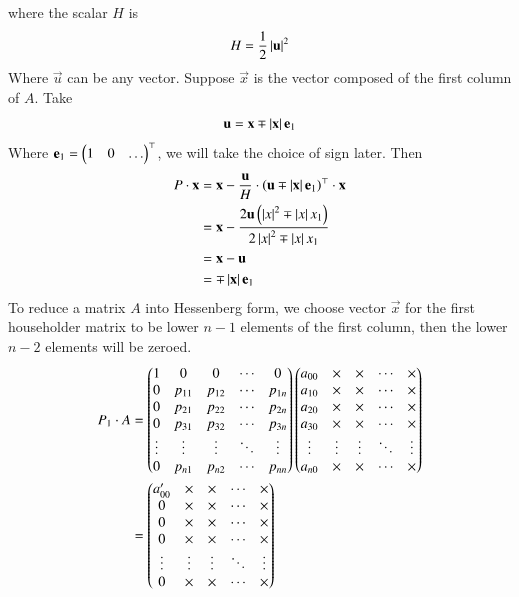 \documentclass[journal]{IEEEtran}
\begin{document}
where the scalar $H$ is
\begin{align}
H = \frac{1}{2}\left\vert\mathbf{u}\right\vert^2
\end{align}
Where $\vec{u}$ can be any vector. Suppose $\vec{x}$ is the vector composed of the first column of $A$. Take
\begin{align}
	\mathbf{u} = \mathbf{x} \mp \left\vert\mathbf{x}\right\vert\mathbf{e}_1
\end{align}
Where $\mathbf{e}_1 = \begin{pmatrix}1 & 0 & \dots\end{pmatrix}^\top$, we will take the choice of sign later. Then
\begin{align}
	P\cdot\mathbf{x} &= \mathbf{x} - \frac{\mathbf{u}}{H}\cdot\left(\mathbf{u}\mp \left\vert\mathbf{x}\right\vert\mathbf{e}_1\right)^\top\cdot \mathbf{x}\\
	              &= \mathbf{x} - \frac{2\mathbf{u}\left(\left\vert x\right\vert^2\mp \left\vert x\right\vert x_1\right)}{2\left\vert x\right\vert^2\mp \left\vert x\right\vert x_1}\\
	              &= \mathbf{x} - \mathbf{u}\\
	              &= \mp\left\vert\mathbf{x}\right\vert\mathbf{e}_1
\end{align}
To reduce a matrix $A$ into Hessenberg form, we choose vector $\vec{x}$ for the first householder matrix to be lower $n-1$ elements of the first column, then the lower $n-2$ elements will be zeroed.
\begin{align}
P_1\cdot A &= \begin{pmatrix}
1 & 0 & 0 & \cdots & 0 \\
0 & p_{11} & p_{12} & \cdots & p_{1n} \\
0      & p_{21} & p_{22} & \cdots & p_{2n} \\
0      & p_{31} & p_{32} & \cdots & p_{3n} \\
\vdots & \vdots & \vdots & \ddots & \vdots \\
0      & p_{n1} & p_{n2} & \cdots & p_{nn}
\end{pmatrix}\begin{pmatrix}
a_{00} & \times & \times & \cdots & \times \\
a_{10} & \times & \times & \cdots & \times \\
a_{20} & \times & \times & \cdots & \times \\
a_{30} & \times & \times & \cdots & \times \\
\vdots & \vdots & \vdots & \ddots & \vdots \\
a_{n0} & \times & \times & \cdots & \times
\end{pmatrix}\\
&=\begin{pmatrix}
a_{00}^\prime & \times & \times & \cdots & \times \\
0 & \times & \times & \cdots & \times \\
0      & \times & \times & \cdots & \times \\
0      & \times   & \times & \cdots & \times \\
\vdots & \vdots & \vdots & \ddots & \vdots \\
0      & \times      & \times      & \cdots & \times
\end{pmatrix}
\end{align}
\end{document}
